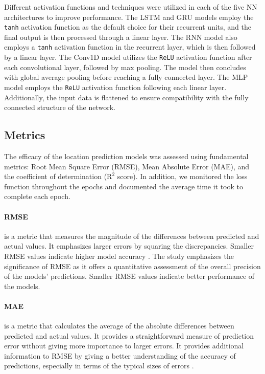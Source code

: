 \documentclass[conference]{IEEEtran}
\begin{document}
{Different activation functions and techniques were utilized in each of the five NN architectures to improve performance. The LSTM and GRU models employ the \texttt{tanh} activation function as the default choice for their recurrent units, and the final output is then processed through a linear layer. The RNN model also employs a \texttt{tanh} activation function in the recurrent layer, which is then followed by a linear layer. The Conv1D model utilizes the \texttt{ReLU} activation function after each convolutional layer, followed by max pooling. The model then concludes with global average pooling before reaching a fully connected layer. The MLP model employs the \texttt{ReLU} activation function following each linear layer. Additionally, the input data is flattened to ensure compatibility with the fully connected structure of the network.

\subsection{Metrics}
The efficacy of the location prediction models was assessed using fundamental metrics: Root Mean Square Error (RMSE), Mean Absolute Error (MAE), and the coefficient of determination ($\text{R}^2$ score). In addition, we monitored the loss function throughout the epochs and documented the average time it took to complete each epoch.

\paragraph{RMSE}
is a metric that measures the magnitude of the differences between predicted and actual values. It emphasizes larger errors by squaring the discrepancies. Smaller RMSE values indicate higher model accuracy \cite{cr05willmott}. The study emphasizes the significance of RMSE as it offers a quantitative assessment of the overall precision of the models' predictions. Smaller RMSE values indicate better performance of the models.

\paragraph{MAE}
is a metric that calculates the average of the absolute differences between predicted and actual values. It provides a straightforward measure of prediction error without giving more importance to larger errors. It provides additional information to RMSE by giving a better understanding of the accuracy of predictions, especially in terms of the typical sizes of errors \cite{cr05willmott}.

}
\end{document}
